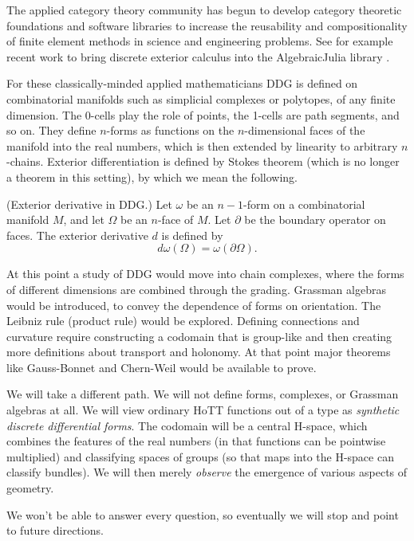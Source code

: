 The applied category theory community has begun to develop category
theoretic foundations and software libraries to increase the reusability
and compositionality of finite element methods in science and
engineering problems. See for example recent work to bring discrete
exterior calculus into the AlgebraicJulia library
\cite{morris_decapodes} \cite{patterson_diffeq}.

For these classically-minded applied mathematicians DDG is defined on
combinatorial manifolds such as simplicial complexes or polytopes, of
any finite dimension. The 0-cells play the role of points, the 1-cells
are path segments, and so on. They define \(n\)-forms as functions on
the \(n\)-dimensional faces of the manifold into the real numbers, which
is then extended by linearity to arbitrary \(n\)-chains. Exterior
differentiation is defined by Stokes theorem (which is no longer a
theorem in this setting), by which we mean the following.

\begin{mydef}
(Exterior derivative in DDG.) Let \( \omega \) be an \( n-1 \)-form on a combinatorial manifold \( M \), and let \( \Omega \) be an \( n \)-face of \( M \). Let \( \partial \) be the boundary operator on faces. The exterior derivative \( d \) is defined by 
\[ 
 d\omega(\Omega) = \omega(\partial\Omega).
\]
\end{mydef}

At this point a study of DDG would move into chain complexes, where the
forms of different dimensions are combined through the grading. Grassman
algebras would be introduced, to convey the dependence of forms on
orientation. The Leibniz rule (product rule) would be explored. Defining
connections and curvature require constructing a codomain that is
group-like and then creating more definitions about transport and
holonomy. At that point major theorems like Gauss-Bonnet and Chern-Weil
would be available to prove.

We will take a different path. We will not define forms, complexes, or
Grassman algebras at all. We will view ordinary HoTT functions out of a
type as \emph{synthetic discrete differential forms}. The codomain will
be a central H-space, which combines the features of the real numbers
(in that functions can be pointwise multiplied) and classifying spaces
of groups (so that maps into the H-space can classify bundles). We will
then merely \emph{observe} the emergence of various aspects of geometry.

We won't be able to answer every question, so eventually we will stop
and point to future directions.

